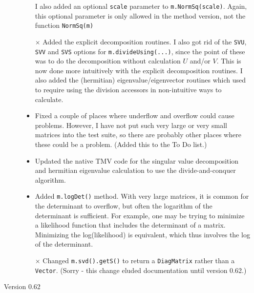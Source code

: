 \documentclass[twoside,letterpaper,11pt]{article}
\renewcommand{\tt}[1]{{\lstinline {#1}}}
\begin{document}
\begin{description}
\begin{itemize}
I also added an optional \tt{scale} parameter to \tt{m.NormSq(scale)}.
Again, this optional parameter is only allowed in the method version, not the function \tt{NormSq(m)}
\item[$\times$]
Added the explicit decomposition routines.  I also
got rid of the \tt{SVU}, \tt{SVV} and \tt{SVS} options for \tt{m.divideUsing(...)}, since the point 
of these was to do the decomposition without calculation $U$ and/or $V$.  This is now done
more intuitively with the explicit decomposition routines.
I also added the (hermitian) eigenvalue/eigenvector routines which used to
require using the division accessors in non-intuitive ways to calculate.
\item 
Fixed a couple of places where underflow and overflow could cause problems.  However, I have
not put such very large or very small matrices into the test suite, so there are probably other
places where these could be a problem.  (Added this to the To Do list.)
\item
Updated the native TMV code for the singular value decomposition and hermitian 
eigenvalue calculation to use the divide-and-conquer algorithm.
\item
Added \tt{m.logDet()} method.  With very large matrices, it is common for the determinant
to overflow, but often the logarithm of the determinant is sufficient.  
For example, one may be trying to minimize a 
likelihood function that
includes the determinant of a matrix.  Minimizing the log(likelihood) is equivalent, which
thus involves the log of the determinant.  
\item[$\times$]
Changed \tt{m.svd().getS()} to return a \tt{DiagMatrix} rather than a \tt{Vector}.
(Sorry - this change eluded documentation until version 0.62.)
\end{itemize}

\item[Version 0.62]


\end{description}
\end{document}
